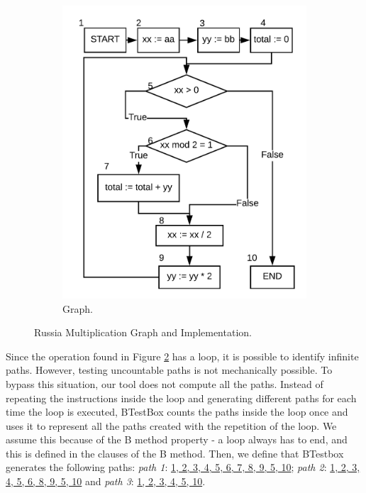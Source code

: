 \documentclass[runningheads]{llncs}
\begin{document}
\begin{figure}[ht]
\begin{minipage}{0.45\textwidth}
\begin{subfigure}{\textwidth}
\includegraphics[width = \textwidth]{imagens/lacoGrafo.png}
\caption{Graph.}
\label{fig:russianMultGraph}
\end{subfigure}
\end{minipage}
\caption{Russia Multiplication Graph and Implementation.}
\end{figure}

Since the operation found in Figure \ref{fig:russianMultGraph} has a loop, it is possible to identify infinite paths. However, testing uncountable paths is not mechanically possible.
To bypass this situation, our tool does not compute all the paths. Instead of repeating the instructions inside the loop and generating different paths for each time the loop is executed, BTestBox counts the paths inside the loop once and uses it to represent all the paths created with the repetition of the loop. We assume this because of the B method property - a loop always has to end, and this is defined in the clauses of the B method. Then, we define that BTestbox generates the following paths: \textit{path 1}: \ul{1, 2, 3, 4, 5, 6, 7, 8, 9, 5, 10};  \textit{path 2}: \ul{1, 2, 3, 4, 5, 6, 8, 9, 5, 10} and \textit{path 3}: \ul{1, 2, 3, 4, 5, 10}.
\end{document}
